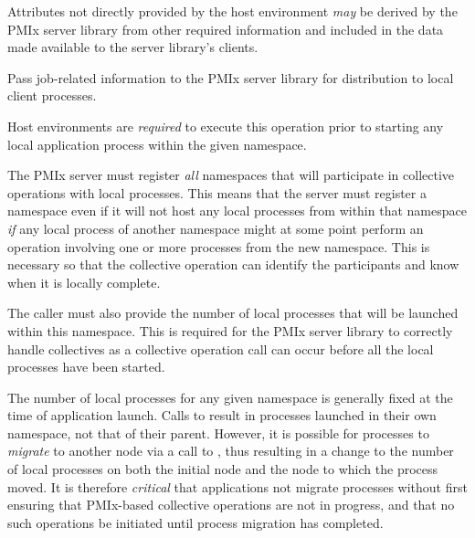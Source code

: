 Attributes not directly provided by the host environment \textit{may} be derived by the \ac{PMIx} server library from other required information and included in the data made available to the server library's clients.

\optattrend

\descr

Pass job-related information to the \ac{PMIx} server library for distribution to local client processes.

\advicermstart
Host environments are \textit{required} to execute this operation prior to starting any local application process within the given namespace.

The \ac{PMIx} server must register \emph{all} namespaces that will participate in collective operations with local processes.
This means that the server must register a namespace even if it will not host any local processes from within that namespace \emph{if} any local process of another namespace might at some point perform an operation involving one or more processes from the new namespace.
This is necessary so that the collective operation can identify the participants and know when it is locally complete.

The caller must also provide the number of local processes that will be launched within this namespace.
This is required for the \ac{PMIx} server library to correctly handle collectives as a collective operation call can occur before all the local processes have been started.
\advicermend

\adviceuserstart
The number of local processes for any given namespace is generally fixed at the time of application launch. Calls to  result in processes launched in their own namespace, not that of their parent. However, it is possible for processes to \textit{migrate} to another node via a call to , thus resulting in a change to the number of local processes on both the initial node and the node to which the process moved. It is therefore \textit{critical} that applications not migrate processes without first ensuring that \ac{PMIx}-based collective operations are not in progress, and that no such operations be initiated until process migration has completed.
\adviceuserend


\subsection{}

